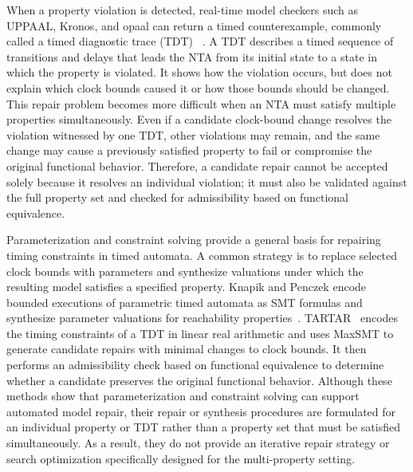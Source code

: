 When a property violation is detected, real-time model checkers such as
UPPAAL, Kronos, and opaal can return a timed counterexample, commonly
called a timed diagnostic trace (TDT)
~\cite{larsen1997uppaal,daws1996kronos,dalsgaard2011opaal}. A TDT
describes a timed sequence of transitions and delays that leads the NTA
from its initial state to a state in which the property is violated. It
shows how the violation occurs, but does not explain which clock bounds
caused it or how those bounds should be changed. This repair problem
becomes more difficult when an NTA must satisfy multiple properties
simultaneously. Even if a candidate clock-bound change resolves the
violation witnessed by one TDT, other violations may remain, and the
same change may cause a previously satisfied property to fail or
compromise the original functional behavior. Therefore, a candidate
repair cannot be accepted solely because it resolves an individual
violation; it must also be validated against the full property set and
checked for admissibility based on functional equivalence.

Parameterization and constraint solving provide a general basis for
repairing timing constraints in timed automata. A common strategy is to
replace selected clock bounds with parameters and synthesize valuations
under which the resulting model satisfies a specified property. Knapik
and Penczek encode bounded executions of parametric timed automata as
SMT formulas and synthesize parameter valuations for reachability
properties~\cite{knapik2016smt}. TARTAR~\cite{kolbl2019clock} encodes
the timing constraints of a TDT in linear real arithmetic and uses
MaxSMT to generate candidate repairs with minimal changes to clock
bounds. It then performs an admissibility
check based on functional equivalence to determine whether a candidate
preserves the original functional behavior. Although these methods show
that parameterization and constraint solving can support automated model
repair, their repair or synthesis procedures are formulated for an
individual property or TDT rather than a property set that must be
satisfied simultaneously. As a result, they do not provide an iterative
repair strategy or search optimization specifically designed for the
multi-property setting.

